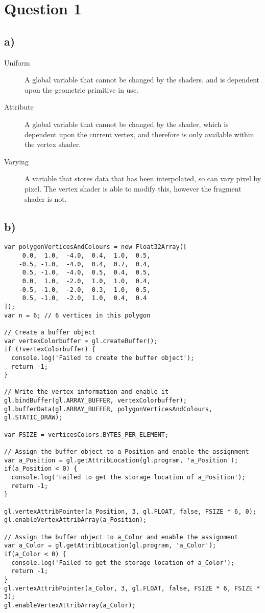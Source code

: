 \documentclass[a4paper,12pt]{article}
\begin{document}
\section*{Question 1}
\subsection*{a)}
\begin{description}
    \item[Uniform]
    A global variable that cannot be changed by the shaders, and is dependent upon the geometric primitive in use.
    \item[Attribute]
    A global variable that cannot be changed by the shader, which is dependent upon the current vertex, and therefore is only available within the vertex shader.
    \item[Varying]
    A variable that stores data that has been interpolated, so can vary pixel by pixel. The vertex shader is able to modify this, however the fragment shader is not.
\end{description}

\subsection*{b)}
\begin{lstlisting}[caption=Colour and vertices in same array]
var polygonVerticesAndColours = new Float32Array([
     0.0,  1.0,  -4.0,  0.4,  1.0,  0.5,
    -0.5, -1.0,  -4.0,  0.4,  0.7,  0.4,
     0.5, -1.0,  -4.0,  0.5,  0.4,  0.5,
     0.0,  1.0,  -2.0,  1.0,  1.0,  0.4,
    -0.5, -1.0,  -2.0,  0.3,  1.0,  0.5,
     0.5, -1.0,  -2.0,  1.0,  0.4,  0.4
]);
var n = 6; // 6 vertices in this polygon

// Create a buffer object
var vertexColorbuffer = gl.createBuffer();
if (!vertexColorbuffer) {
  console.log('Failed to create the buffer object');
  return -1;
}

// Write the vertex information and enable it
gl.bindBuffer(gl.ARRAY_BUFFER, vertexColorbuffer);
gl.bufferData(gl.ARRAY_BUFFER, polygonVerticesAndColours, gl.STATIC_DRAW);

var FSIZE = verticesColors.BYTES_PER_ELEMENT;

// Assign the buffer object to a_Position and enable the assignment
var a_Position = gl.getAttribLocation(gl.program, 'a_Position');
if(a_Position < 0) {
  console.log('Failed to get the storage location of a_Position');
  return -1;
}

gl.vertexAttribPointer(a_Position, 3, gl.FLOAT, false, FSIZE * 6, 0);
gl.enableVertexAttribArray(a_Position);

// Assign the buffer object to a_Color and enable the assignment
var a_Color = gl.getAttribLocation(gl.program, 'a_Color');
if(a_Color < 0) {
  console.log('Failed to get the storage location of a_Color');
  return -1;
}
gl.vertexAttribPointer(a_Color, 3, gl.FLOAT, false, FSIZE * 6, FSIZE * 3);
gl.enableVertexAttribArray(a_Color);
\end{lstlisting}
\end{document}
